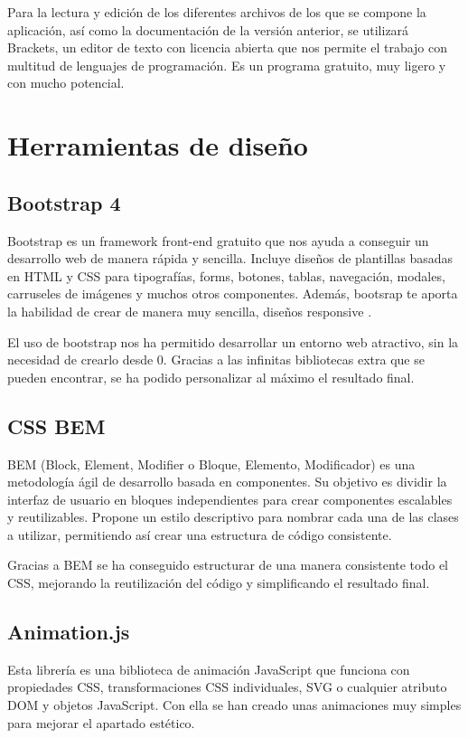 Para la lectura y edición de los diferentes archivos de los que se compone la aplicación, así como la documentación de la versión anterior, se utilizará Brackets, un editor de texto con licencia abierta que nos permite el trabajo con multitud de lenguajes de programación. Es un programa gratuito, muy ligero y con mucho potencial. 

\section{Herramientas de diseño}

\subsection{Bootstrap 4}

Bootstrap es un framework front-end gratuito que nos ayuda a conseguir un desarrollo web de manera rápida y sencilla. Incluye diseños de plantillas basadas en HTML y CSS para tipografías, forms, botones, tablas, navegación, modales, carruseles de imágenes y muchos otros componentes. Además, bootsrap te aporta la habilidad de crear de manera muy sencilla, diseños responsive \cite{Bootstrap}. 

El uso de bootstrap nos ha permitido desarrollar un entorno web atractivo, sin la necesidad de crearlo desde 0. Gracias a las infinitas bibliotecas extra que se pueden encontrar, se ha podido personalizar al máximo el resultado final.

\subsection{CSS BEM}

BEM (Block, Element, Modifier o Bloque, Elemento, Modificador) es una metodología ágil de desarrollo basada en componentes. Su objetivo es dividir la interfaz de usuario en bloques independientes para crear componentes escalables y reutilizables. Propone un estilo descriptivo para nombrar cada una de las clases a utilizar, permitiendo así crear una estructura de código consistente.

Gracias a BEM se ha conseguido estructurar de una manera consistente todo el CSS, mejorando la reutilización del código y simplificando el resultado final.


\subsection{Animation.js}
Esta librería es una biblioteca de animación JavaScript que funciona con propiedades CSS, transformaciones CSS individuales, SVG o cualquier atributo DOM y objetos JavaScript. Con ella se han creado unas animaciones muy simples para mejorar el apartado estético.

